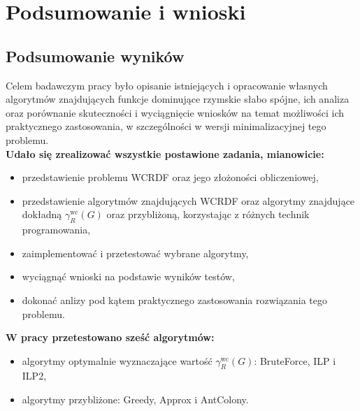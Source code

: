 \chapter{Podsumowanie i wnioski}

\section{Podsumowanie wyników}

Celem badawczym pracy było opisanie istniejących i opracowanie własnych algorytmów znajdujących funkcje dominujące rzymskie słabo spójne, ich analiza oraz porównanie skuteczności i wyciągnięcie wniosków na temat możliwości ich praktycznego zastosowania, w szczególności w wersji minimalizacyjnej tego problemu.\\
\textbf{Udało się zrealizować wszystkie postawione zadania, mianowicie:}
\begin{itemize}
    \item przedstawienie problemu WCRDF oraz jego złożoności obliczeniowej,
    \item przedstawienie algorytmów znajdujących WCRDF oraz algorytmy znajdujące dokładną  $\gamma^{\text{wc}}_R(G)$ oraz przybliżoną, korzystając z różnych technik programowania,
    \item zaimplementować i przetestować wybrane algorytmy,
    \item wyciągnąć wnioski na podstawie wyników testów,
    \item dokonać anlizy pod kątem praktycznego zastosowania rozwiązania tego problemu.
\end{itemize}

\textbf{W pracy przetestowano sześć algorytmów:}
\begin{itemize}
    \item algorytmy optymalnie wyznaczające wartość $\gamma^{\text{wc}}_R(G)$: BruteForce, ILP i ILP2,
    \item algorytmy przybliżone: Greedy, Approx i AntColony.
\end{itemize}

